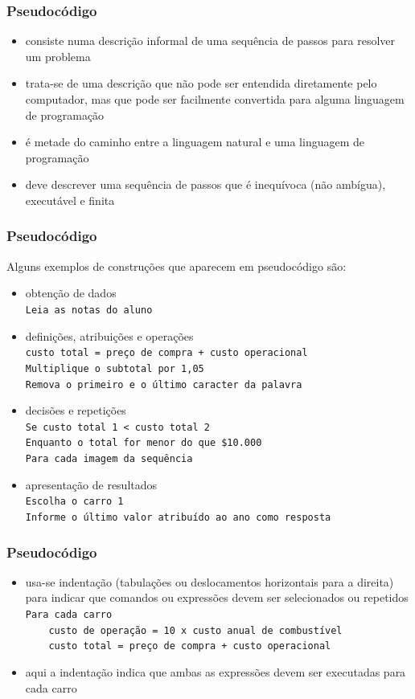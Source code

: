 \documentclass[aspectratio=169]{beamer}
\begin{document}
\begin{frame}\frametitle{Pseudocódigo}
\begin{itemize}
	\item consiste numa descrição informal de uma sequência de passos para resolver um problema
	\item trata-se de uma descrição que não pode ser entendida diretamente pelo computador, mas que pode ser facilmente convertida para alguma linguagem de programação
	\item é metade do caminho entre a linguagem natural e uma linguagem de programação
	\item deve descrever uma sequência de passos que é inequívoca (não ambígua), executável e finita
\end{itemize}
\end{frame}

\begin{frame}\frametitle{Pseudocódigo}
{\footnotesize Alguns exemplos de construções que aparecem em pseudocódigo são:
\begin{itemize}
	\item obtenção de dados\\
\texttt{Leia as notas do aluno}
	\item definições, atribuições e operações\\
\texttt{custo total = preço de compra + custo operacional\\
Multiplique o subtotal por 1,05\\
Remova o primeiro e o último caracter da palavra}
	\item decisões e repetições\\
\texttt{Se custo total 1 < custo total 2\\
Enquanto o total for menor do que \$10.000\\
Para cada imagem da sequência}
	\item apresentação de resultados\\
\texttt{Escolha o carro 1\\
Informe o último valor atribuído ao ano como resposta}
\end{itemize}}
\end{frame}

\begin{frame}\frametitle{Pseudocódigo}
\begin{itemize}
	\item usa-se indentação (tabulações ou deslocamentos horizontais para a direita) para indicar que comandos ou expressões devem ser selecionados ou repetidos\\
\texttt{Para cada carro\\
~ ~ custo de operação = 10 x custo anual de combustível\\
~ ~ custo total = preço de compra + custo operacional}
	\item aqui a indentação indica que ambas as expressões devem ser executadas para cada carro
\end{itemize}
\end{frame}
\end{document}

